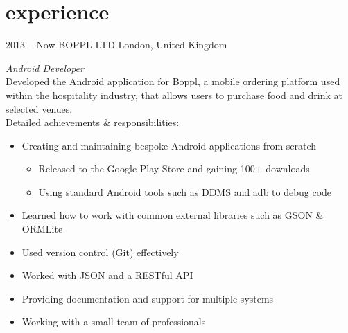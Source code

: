 \documentclass[]{friggeri-cv} %
\begin{document}

\section{experience}

\begin{entrylist}
\entry
{2013 -- Now}
{BOPPL LTD}
{London, United Kingdom}
{\emph{Android Developer} \\
Developed the Android application for Boppl, a mobile ordering platform used within the hospitality industry, that allows users to purchase food and drink at selected venues. \\
Detailed achievements \& responsibilities:
\begin{itemize}
\item Creating and maintaining bespoke Android applications from scratch
\begin{itemize}
\item Released to the Google Play Store and gaining 100+ downloads
\item Using standard Android tools such as DDMS and adb to debug code
\end{itemize}
\item Learned how to work with common external libraries such as GSON \& ORMLite
\item Used version control (Git) effectively
\item Worked with JSON and a RESTful API
\item Providing documentation and support for multiple systems
\item Working with a small team of professionals
%

\end{itemize}}
\end{entrylist}
\end{document}
